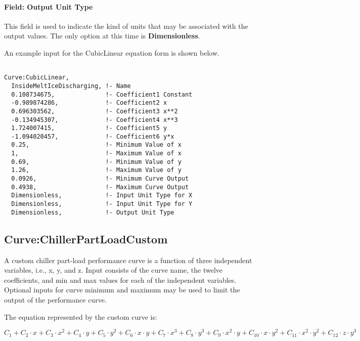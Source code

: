 \paragraph{Field: Output Unit Type}\label{field-output-unit-type-7}

This field is used to indicate the kind of units that may be associated with the output values. The only option at this time is \textbf{Dimensionless}.

An example input for the CubicLinear equation form is shown below.

\begin{lstlisting}

Curve:CubicLinear, 
  InsideMeltIceDischarging, !- Name
  0.108734675,              !- Coefficient1 Constant
  -0.989874286,             !- Coefficient2 x
  0.696303562,              !- Coefficient3 x**2
  -0.134945307,             !- Coefficient4 x**3
  1.724007415,              !- Coefficient5 y
  -1.094020457,             !- Coefficient6 y*x
  0.25,                     !- Minimum Value of x
  1,                        !- Maximum Value of x
  0.69,                     !- Minimum Value of y
  1.26,                     !- Maximum Value of y
  0.0926,                   !- Minimum Curve Output
  0.4938,                   !- Maximum Curve Output
  Dimensionless,            !- Input Unit Type for X
  Dimensionless,            !- Input Unit Type for Y
  Dimensionless,            !- Output Unit Type
\end{lstlisting}

\subsection{Curve:ChillerPartLoadCustom}\label{curvechillerpartloadcustom}

A custom chiller part-load performance curve is a function of three independent variables, i.e., x, y, and z. Input consists of the curve name, the twelve coefficients, and min and max values for each of the independent variables. Optional inputs for curve minimum and maximum may be used to limit the output of the performance curve.

The equation represented by the custom curve is:

\begin{equation}
C_1 + C_2 \cdot x + C_3 \cdot x^2 + C_4 \cdot y + C_5 \cdot y^2 + C_6 \cdot x \cdot y + C_7 \cdot x^3 + C_8 \cdot y^3 + C_9 \cdot x^2 \cdot y + C_{10} \cdot x \cdot y^2 + C_{11} \cdot x^2 \cdot y^2 + C_{12} \cdot z \cdot y^3
\end{equation}

